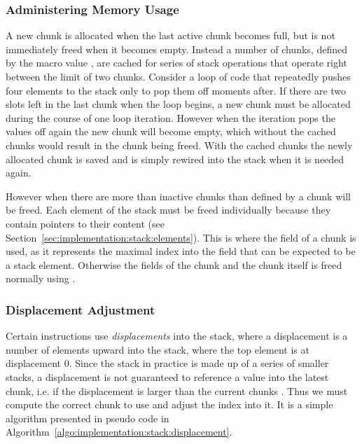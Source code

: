 \subsubsection{Administering Memory Usage}

A new chunk is allocated when the last active chunk becomes full, but is not
immediately freed when it becomes empty. Instead a number of chunks, defined by
the macro value , are cached for series of
stack operations that operate right between the limit of two chunks. Consider a
loop of code that repeatedly pushes four elements to the stack only to pop them
off moments after. If there are two slots left in the last chunk when the loop
begins, a new chunk must be allocated during the course of one loop
iteration. However when the iteration pops the values off again the new chunk
will become empty, which without the cached chunks would result in the chunk
being freed. With the cached chunks the newly allocated chunk is saved and is
simply rewired into the stack when it is needed again.

However when there are more than inactive chunks than defined by
 a chunk will be freed. Each element of the
stack must be freed individually because they contain pointers to their content
(see Section~\ref{sec:implementation:stack:elements}). This is where the
 field of a chunk is used, as it represents the maximal index into
the  field that can be expected to be a stack element. Otherwise
the fields of the chunk and the chunk itself is freed normally using
.

\subsubsection{Displacement Adjustment}

Certain instructions use \textit{displacements} into the stack, where a
displacement is a number of elements upward into the stack, where the top
element is at displacement 0. Since the stack in practice is made up of a series
of smaller stacks, a displacement is not guaranteed to reference a value into
the latest chunk, i.e. if the displacement is larger than the current chunks
. Thus we must compute the correct chunk to use and adjust the
index into it. It is a simple algorithm presented in pseudo code in
Algorithm~\ref{algo:implementation:stack:displacement}.

